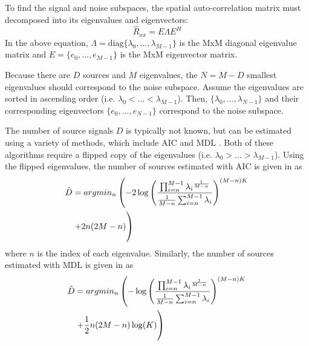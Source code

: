 \documentclass[conference]{IEEEtran}
\begin{document}
		To find the signal and noise subspaces, the spatial auto-correlation matrix must decomposed into its eigenvalues and eigenvectors:
	\begin{equation}
		\hat{R}_{xx} = E{\Lambda}E^H
	\end{equation}
	In the above equation, $\Lambda = \text{diag}\{\lambda_0,...,\lambda_{M-1}\}$ is the MxM diagonal eigenvalue matrix and $E=\{e_0,...,e_{M-1}\}$ is the MxM eigenvector matrix.
	
	Because there are $D$ sources and $M$ eigenvalues, the $N = M - D$ smallest eigenvalues should correspond to the noise subspace. Assume the eigenvalues are sorted in ascending order (i.e. $\lambda_0 < ... < \lambda_{M-1}$). Then, $\{\lambda_0,...,\lambda_{N-1}\}$ and their corresponding eigenvectors $\{e_0,...,e_{N-1}\}$ correspond to the noise subspace.
	
	The number of source signals $D$ is typically not known, but can be estimated using a variety of methods, which include AIC and MDL \cite{num_sources_est_salman}. Both of these algorithms require a flipped copy of the eigenvalues (i.e. $\lambda_0 > ... > \lambda_{M-1}$). Using the flipped eigenvalues, the number of sources estimated with AIC is given in \cite{num_sources_est_salman} as
	\begin{equation}
		\begin{split}
		\hat{D} &= argmin_n\left(-2\log\left(\frac{\prod_{i=n}^{M-1}{{\lambda_i}^{\frac{1}{M-n}}}}{\frac{1}{M - n}\sum_{i=n}^{M-1}{\lambda_i}}\right)^{(M-n)K}\right. \\
		& \left. + 2n(2M - n) \vphantom{-2\log\left(\frac{\prod_{i=n}^{M-1}{{\lambda_i}^{\frac{1}{M-k}}}}{\frac{1}{M - n}\sum_{i=n}^{M-1}{\lambda_i}}\right)^{(M-n)K}} \right)
		\end{split}
	\end{equation}
	where $n$ is the index of each eigenvalue. Similarly, the number of sources estimated with MDL is given in \cite{num_sources_est_salman} as
	\begin{equation}
		\begin{split}
		\hat{D} &= argmin_n\left(-\log\left(\frac{\prod_{i=n}^{M-1}{{\lambda_i}^{\frac{1}{M-n}}}}{\frac{1}{M - n}\sum_{i=n}^{M-1}{\lambda_i}}\right)^{(M-n)K}\right. \\
		& \left. + \frac{1}{2}n(2M - n)\log(K) \vphantom{-\log\left(\frac{\prod_{i=n}^{M-1}{{\lambda_i}^{\frac{1}{M-k}}}}{\frac{1}{M - n}\sum_{i=n}^{M-1}{\lambda_i}}\right)^{(M-n)K}} \right)
		\end{split}
	\end{equation}
	
\end{document}
